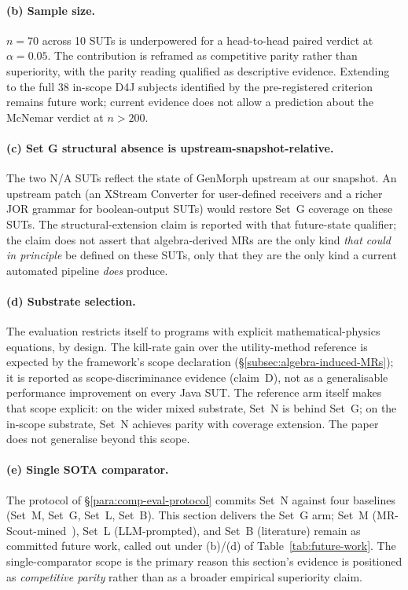 \paragraph{(b) Sample size.}
$n = 70$ across 10 SUTs is underpowered for a head-to-head paired
verdict at $\alpha = 0.05$. The contribution is reframed as
competitive parity rather than superiority, with the parity reading
qualified as descriptive evidence. Extending to the full 38 in-scope
D4J subjects identified by the pre-registered criterion remains future
work; current evidence does not allow a prediction about the McNemar
verdict at $n > 200$.

\paragraph{(c) Set G structural absence is upstream-snapshot-relative.}
The two N/A SUTs reflect the state of GenMorph upstream at our
snapshot. An upstream patch (an XStream Converter for user-defined
receivers and a richer JOR grammar for boolean-output SUTs) would
restore Set~G coverage on these SUTs. The structural-extension claim
is reported with that future-state qualifier; the claim does not
assert that algebra-derived MRs are the only kind \emph{that could in
principle} be defined on these SUTs, only that they are the only kind
a current automated pipeline \emph{does} produce.

\paragraph{(d) Substrate selection.}
The evaluation restricts itself to programs with explicit
mathematical-physics equations, by design. The kill-rate gain over
the utility-method reference is expected by the framework's scope
declaration (\S\ref{subsec:algebra-induced-MRs}); it is reported as
scope-discriminance evidence (claim~D), not as a generalisable
performance improvement on every Java SUT. The reference arm itself
makes that scope explicit: on the wider mixed substrate, Set~N is
behind Set~G; on the in-scope substrate, Set~N achieves parity with
coverage extension. The paper does not generalise beyond this scope.

\paragraph{(e) Single SOTA comparator.}
The protocol of \S\ref{para:comp-eval-protocol} commits Set~N
against four baselines (Set~M, Set~G, Set~L, Set~B). This section
delivers the Set~G arm; Set~M (MR-Scout-mined~\cite{MRScout2024}),
Set~L (LLM-prompted), and Set~B (literature) remain as committed
future work, called out under (b)/(d) of Table~\ref{tab:future-work}.
The single-comparator scope is the primary reason this section's
evidence is positioned as \emph{competitive parity} rather than as a
broader empirical superiority claim.

